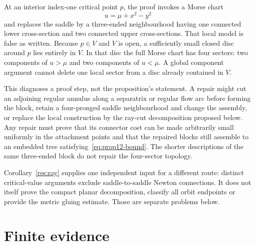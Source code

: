 \documentclass[11pt]{article}
\begin{document}
At an interior index-one critical point $p$, the proof invokes a Morse chart
\[
 u=\mu+x^2-y^2
\]
and replaces the saddle by a three-ended neighbourhood having one connected
lower cross-section and two connected upper cross-sections.  That local model
is false as written.  Because $p\in V$ and $V$ is open, a sufficiently small
closed disc around $p$ lies entirely in $V$.  In that disc the full Morse chart
has four sectors: two components of $u>\mu$ and two components of $u<\mu$.
A global component argument cannot delete one local sector from a disc already
contained in $V$.

This diagnoses a proof step, not the proposition's statement.  A repair might
cut an adjoining regular annulus along a separatrix or regular flow arc before
forming the block, retain a four-pronged saddle neighbourhood and change the
assembly, or replace the local construction by the ray-cut decomposition
proposed below.  Any repair must prove that its connector cost can be made
arbitrarily small uniformly in the attachment points and that the repaired
blocks still assemble to an embedded tree satisfying~\eqref{eq:prop12-bound}.
The shorter descriptions of the same three-ended block do not repair the
four-sector topology.

Corollary~\ref{res:ray} supplies one independent input for a different route:
distinct critical-value arguments exclude saddle-to-saddle Newton
connections.  It does not itself prove the compact planar decomposition,
classify all orbit endpoints or provide the metric gluing estimate.  Those are
separate problems below.

\section{Finite evidence}\label{sec:finite}
\end{document}
